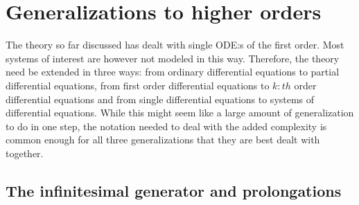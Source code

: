 \section{Generalizations to higher orders}

The theory so far discussed has dealt with single ODE:s of the first order.
Most systems of interest are however not modeled in this way.
Therefore, the theory need be extended in three ways: from ordinary differential equations to partial differential equations, from first order differential equations to \(k:th\) order differential equations and from single differential equations to systems of differential equations.
While this might seem like a large amount of generalization to do in one step, the notation needed to deal with the added complexity is common enough for all three generalizations that they are best dealt with together.

\subsection{The infinitesimal generator and prolongations}

